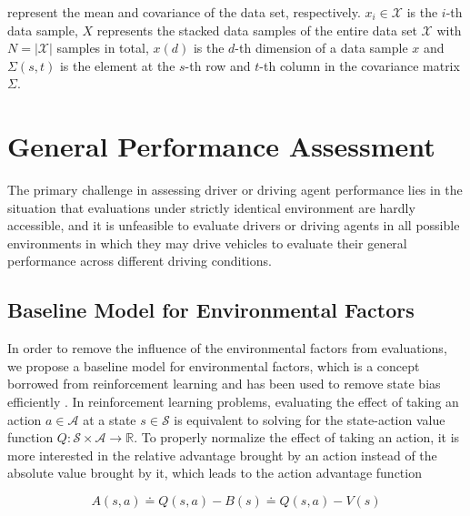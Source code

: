 \documentclass{article}
\begin{document}
represent the mean and covariance of the data set, respectively. $ x_{i} \in \mathcal{X} $ is the $i$-th data sample, $ X $ represents the stacked data samples of the entire data set $ \mathcal{X} $ with $ N = |\mathcal{X}| $ samples in total, $ x(d) $ is the $d$-th dimension of a data sample $ x $ and $ \Sigma(s,t) $ is the element at the $s$-th row and $t$-th column in the covariance matrix $ \Sigma $.


\section{General Performance Assessment}\label{sec:general_performance_assessment}


The primary challenge in assessing driver or driving agent performance lies in the situation that evaluations under strictly identical environment are hardly accessible, and it is unfeasible to evaluate drivers or driving agents in all possible environments in which they may drive vehicles to evaluate their general performance across different driving conditions.


\subsection{Baseline Model for Environmental Factors}\label{sec:baseline_model}

In order to remove the influence of the environmental factors from evaluations, we propose a baseline model for environmental factors, which is a concept borrowed from reinforcement learning and has been used to remove state bias efficiently \cite{wang2015dueling}. In reinforcement learning problems, evaluating the effect of taking an action $ a \in \mathcal{A} $ at a state $ s \in \mathcal{S} $ is equivalent to solving for the state-action value function $ Q: \mathcal{S} \times \mathcal{A} \rightarrow \mathbb{R} $. To properly normalize the effect of taking an action, it is more interested in the relative advantage brought by an action instead of the absolute value brought by it, which leads to the action advantage function

\[
A(s, a) \doteq Q(s, a) - B(s) \doteq Q(s, a) - V(s)
\]
\end{document}
